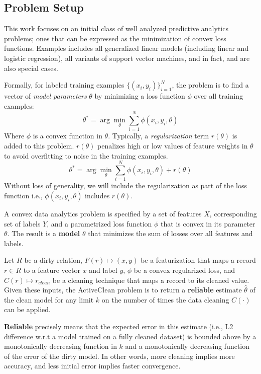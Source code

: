 \subsection{Problem Setup}
This work focuses on an initial class of well analyzed predictive analytics problems; ones that can be expressed as the minimization of convex loss functions.
Examples includes all generalized linear models (including linear and logistic regression), all variants of support vector machines, and in fact, \avgfunc and \medfunc are also special cases. 

Formally, for labeled training examples $\{(x_{i},y_{i})\}_{i=1}^{N}$, the problem is to find a vector of \emph{model parameters} $\theta$ by minimizing a loss function $\phi$ over all training examples:
\[
 \theta^{*}=\arg\min_{\theta}\sum_{i=1}^{N}\phi(x_{i},y_{i},\theta)
\]
Where $\phi$ is a convex function in $\theta$.
Typically, a \emph{regularization} term $r(\theta)$ is added to this problem.
$r(\theta)$ penalizes high or low values of feature weights in $\theta$ to avoid overfitting to noise in the training examples.
\[
 \theta^{*}=\arg\min_{\theta}\sum_{i=1}^{N}\phi(x_{i},y_{i},\theta) + r(\theta)
\]
Without loss of generality, we will include the regularization as part of the loss function i.e., $\phi(x_{i},y_{i},\theta)$ includes $r(\theta)$.

\begin{definition}
A convex data analytics problem is specified by a set of features $X$, corresponding set of labels $Y$, and a parametrized loss function $\phi$ that is convex in its parameter $\theta$.
The result is a \textbf{model} $\theta$ that minimizes the sum of losses over all features and labels.
\end{definition}

\begin{problem}\label{activeclean}\sloppy
Let $R$ be a dirty relation, $F(r) \mapsto (x,y)$ be a featurization that maps
a record $r \in R$ to a feature vector $x$ and label $y$, $\phi$ be a convex regularized loss,
and $C(r) \mapsto r_{clean}$ be a cleaning technique that maps a record to its cleaned value. 
Given these inputs, the ActiveClean problem is to return a \textbf{reliable} estimate $\hat{\theta}$ of the clean model for any limit $k$ on the number of times the data cleaning $C(\cdot)$ can be applied.

\vspace{0.5em}

\textbf{Reliable} precisely means that the expected error in this estimate (i.e., L2 difference w.r.t a model trained on a fully cleaned dataset) is bounded above by a monotonically decreasing function in $k$ and a monotonically decreasing function of the error of the dirty model. In other words, more cleaning implies more accuracy, and less initial error implies faster convergence.
\end{problem}

